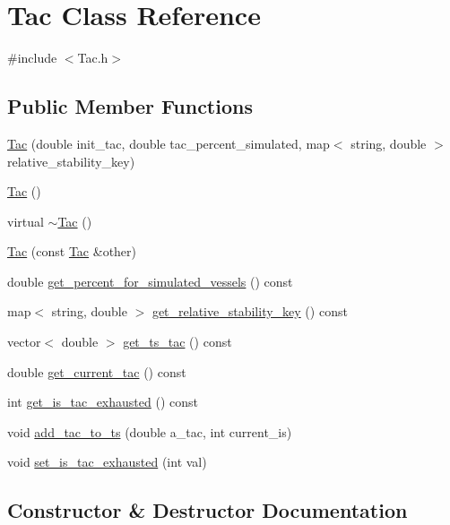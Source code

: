 \hypertarget{class_tac}{}\section{Tac Class Reference}
\label{class_tac}


{\ttfamily \#include $<$Tac.\+h$>$}

\subsection*{Public Member Functions}
\begin{DoxyCompactItemize}
\item 
\mbox{\hyperlink{class_tac_ac2f7db252737bd30482acebc61c5c349}{Tac}} (double init\+\_\+tac, double tac\+\_\+percent\+\_\+simulated, map$<$ string, double $>$ relative\+\_\+stability\+\_\+key)
\item 
\mbox{\hyperlink{class_tac_a7c1be5c4d004559141c0b2fff40f33d7}{Tac}} ()
\item 
virtual \mbox{\hyperlink{class_tac_aae7c1dd2aa942295c6daf8f5706b4e10}{$\sim$\+Tac}} ()
\item 
\mbox{\hyperlink{class_tac_a6770d4433928411a79f8e7ab6ea4f29f}{Tac}} (const \mbox{\hyperlink{class_tac}{Tac}} \&other)
\item 
double \mbox{\hyperlink{class_tac_ad2d1bcd136c4ee8418b53acbc2e4c715}{get\+\_\+percent\+\_\+for\+\_\+simulated\+\_\+vessels}} () const
\item 
map$<$ string, double $>$ \mbox{\hyperlink{class_tac_a0cebd3a8dc0b69ff4ab830f7d8d94bff}{get\+\_\+relative\+\_\+stability\+\_\+key}} () const
\item 
vector$<$ double $>$ \mbox{\hyperlink{class_tac_ae6ddf5154e90a2774b73e1e9fe4daa44}{get\+\_\+ts\+\_\+tac}} () const
\item 
double \mbox{\hyperlink{class_tac_af7b0fdccf4c0e4a8e8452a6127e88015}{get\+\_\+current\+\_\+tac}} () const
\item 
int \mbox{\hyperlink{class_tac_a9bbebdb1d973ef31671f2108567a4344}{get\+\_\+is\+\_\+tac\+\_\+exhausted}} () const
\item 
void \mbox{\hyperlink{class_tac_a366986834afa3547ef151cd1290d26d1}{add\+\_\+tac\+\_\+to\+\_\+ts}} (double a\+\_\+tac, int current\+\_\+is)
\item 
void \mbox{\hyperlink{class_tac_a68913ab17720a532fd1adca3c4c08ddf}{set\+\_\+is\+\_\+tac\+\_\+exhausted}} (int val)
\end{DoxyCompactItemize}


\subsection{Constructor \& Destructor Documentation}
\mbox{\label{class_tac_ac2f7db252737bd30482acebc61c5c349}} 
